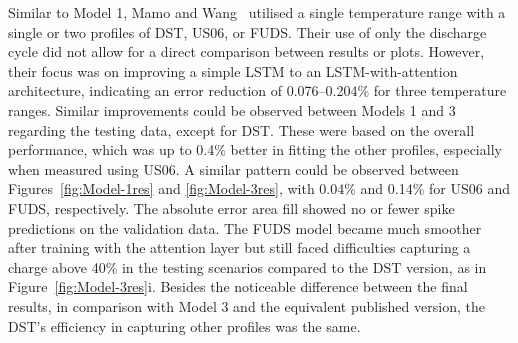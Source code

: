 %
%
Similar to Model 1, Mamo and Wang~\cite{mamo_long_2020} utilised a single temperature range with a single or two profiles of DST, US06, or FUDS.
Their use of only the discharge cycle did not allow for a direct comparison between results or plots.
However, their focus was on improving a simple LSTM to an LSTM-with-attention architecture, indicating an error reduction of 0.076--0.204\% for three temperature ranges.
Similar improvements could be observed between Models 1 and 3 regarding the testing data, except for DST.
These were based on the overall performance, which was up to 0.4\% better in fitting the other profiles, especially when measured using US06.
A similar pattern could be observed between Figures~\ref{fig:Model-1res} and \ref{fig:Model-3res}, with 0.04\% and 0.14\% for US06 and FUDS, respectively.
The absolute error area fill showed no or fewer spike predictions on the validation data.
The FUDS model became much smoother after training with the attention layer but still faced difficulties capturing a charge above 40\% in the testing scenarios compared to the DST version, as in Figure~\ref{fig:Model-3res}i.
Besides the noticeable difference between the final results, in comparison with Model 3 and the equivalent published version, the DST's efficiency in capturing other profiles was the same.

